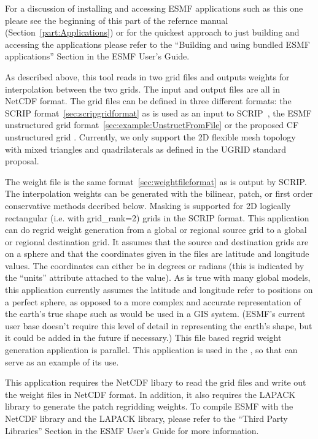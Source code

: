For a discussion of installing and accessing ESMF applications such as this one please see the beginning of this part of the refernce manual (Section~\ref{part:Applications}) or for the quickest approach to just building and accessing the applications please refer to the ``Building and using bundled ESMF applications'' Section in the ESMF User's Guide.

As described above, this tool reads in
two grid files and outputs weights for interpolation
between the two grids. The input and output files are all in NetCDF format. The grid files can be defined in three
different formats:  the SCRIP format~\ref{sec:scripgridformat} as is used as an input to SCRIP~\cite{ref:SCRIP}, 
the ESMF unstructured grid format~\ref{sec:example:UnstructFromFile} or the proposed CF unstructured grid 
. 
Currently, we only support the 2D flexible mesh topology with mixed triangles and quadrilaterals as defined in the UGRID standard proposal.

The weight file is the same format~\ref{sec:weightfileformat} as is 
output by SCRIP. The interpolation weights can be generated with
the bilinear, patch, or first order conservative methods decribed below. Masking is supported for 2D logically rectangular (i.e. with grid\_rank=2) grids in the SCRIP format. This application 
can do regrid weight generation from a global or regional source grid to a global or regional destination grid.
It assumes that the source and destination grids are on a sphere and that the coordinates given in 
the files are latitude and longitude values. The coordinates can either be in degrees or radians (this is indicated by the ``units'' attribute attached to the value). 
As is true with many global models, this application currently assumes the latitude and longitude refer to positions on a perfect sphere, as opposed to a more complex 
and accurate representation of the earth's true shape such as would be used in a GIS system. (ESMF's current user base doesn't require this level of detail in representing the earth's shape, but it could be added in the future if necessary.)  This file based regrid weight generation application 
is parallel. This application is used in the
, so that can serve as an example of its use.

This application requires the NetCDF libary to read the grid files and write
out the weight files in NetCDF format.  
In addition, it also requires the LAPACK library to generate the patch regridding weights.
To compile ESMF with the NetCDF library and the LAPACK library, please refer to 
the ``Third Party Libraries'' Section in the ESMF User's Guide for more information.

